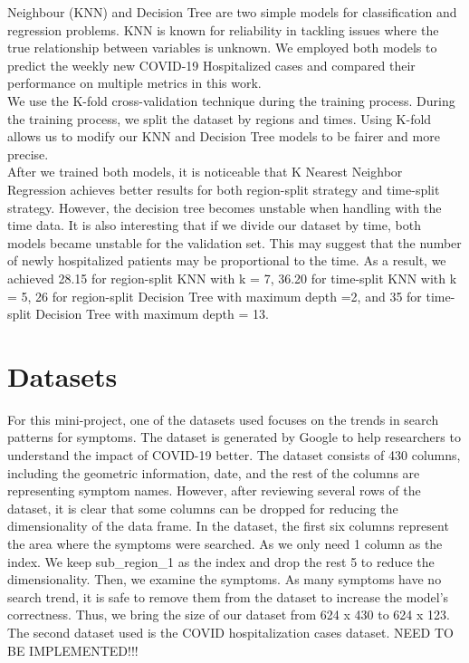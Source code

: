 \documentclass[journal,11pt]{IEEEtran}
\begin{document}
 Neighbour (KNN) and Decision Tree are two simple models for classification and regression problems. KNN is known for reliability in tackling issues where the true relationship between variables is unknown. We employed both models to predict the weekly new COVID-19 Hospitalized cases and compared their performance on multiple metrics in this work. \\
\indent We use the K-fold cross-validation technique during the training process. During the training process, we split the dataset by regions and times. Using K-fold allows us to modify our KNN and Decision Tree models to be fairer and more precise.\\
\indent After we trained both models, it is noticeable that K Nearest Neighbor Regression achieves better results for both region-split strategy and time-split strategy. However, the decision tree becomes unstable when handling with the time data. It is also interesting that if we divide our dataset by time, both models became unstable for the validation set. This may suggest that the number of newly hospitalized patients may be proportional to the time. As a result, we achieved 28.15 for region-split KNN with k = 7, 36.20 for time-split KNN with k = 5, 26 for region-split Decision Tree with maximum depth =2, and 35 for time-split Decision Tree with maximum depth = 13.


\section{Datasets}
For this mini-project, one of the datasets used focuses on the trends in search patterns for symptoms. The dataset is generated by Google to help researchers to understand the impact of COVID-19 better. The dataset consists of 430 columns, including the geometric information, date, and the rest of the columns are representing symptom names. However, after reviewing several rows of the dataset, it is clear that some columns can be dropped for reducing the dimensionality of the data frame. In the dataset, the first six columns represent the area where the symptoms were searched. As we only need 1 column as the index. We keep sub\_region\_1 as the index and drop the rest 5 to reduce the dimensionality. Then, we examine the symptoms.  As many symptoms have no search trend, it is safe to remove them from the dataset to increase the model's correctness. Thus, we bring the size of our dataset from 624 x 430 to 624 x 123.
\newline \indent The second dataset used is the COVID hospitalization cases dataset. NEED TO BE IMPLEMENTED!!!
\end{document}
